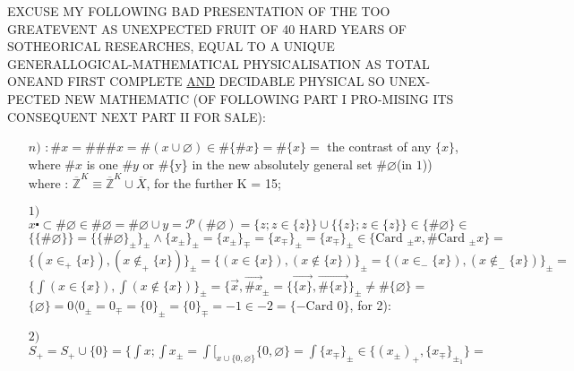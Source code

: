 \documentclass{article}
\begin{document}
\large
\noindent
EXCUSE MY FOLLOWING \guillemotleft BAD\guillemotright {} PRESENTATION OF THE TOO GREAT\linebreak EVENT AS UNEXPECTED FRUIT OF 40 HARD YEARS OF SO\linebreak THEORICAL RESEARCHES, EQUAL TO A UNIQUE GENERAL\linebreak LOGICAL-MATHEMATICAL PHYSICALISATION AS TOTAL ONE\linebreak AND FIRST COMPLETE \underline{AND} DECIDABLE PHYSICAL SO UNEX-\linebreak PECTED NEW MATHEMATIC (OF FOLLOWING PART I PRO-\linebreak MISING ITS CONSEQUENT NEXT PART II FOR SALE):
\begin{Large}{

\begin{itemize}
    \item[$n)$] $:\#x=\#\#\# x = \#(x\cup  \varnothing ) \in \# \{ \# x \} = \# \{x\}=$ the contrast of any\newline
    $\{x\}$, where $\# x$ is one \guillemotleft $\# y$ or \#\{y\}\guillemotright{} in the new absolutely general \newline
    set $\# \varnothing$(in $1$)) where : $\overline{\mathbb{Z}}^K \equiv \overline{\mathbb{Z}}^K \cup \overline{X}$, for the further K = 15;
    \item[$1)$]  $x \centerdot \subset \# \varnothing\in \#\varnothing = \#\varnothing\cup y= \mathcal{P}(\#\varnothing)=\{z;z\in \{z\}\}\cup \{\{z\};z\in \{z\}\} \in \{\#\varnothing\}\in $\newline
    $\{\{\#\varnothing\}\} = \{\{\#\varnothing\}_\pm\}_\pm \wedge \{x_\pm\}_\pm = \{x_\pm\}_\mp =\{x_\mp\}_\pm =\{x_\mp\}_\pm \in \{\text{Card }_\pm x, \# \text{Card }_\pm x \} = $\newline
    $\{(x\in_+ \{x\}),(x\notin_+ \{x\})\}_\pm = \{(x\in \{x\}),(x\notin\{x\})\}_\pm= \{(x\in_- \{x\}),(x\notin_- \{x\})\}_\pm =$  \newline
    $\{ \int (x\in \{x\}), \int (x\notin \{x\})\}_\pm = \{ \overrightarrow{x}, \overrightarrow{\# x}_\pm = \{  \overrightarrow{\{x\}},  \overrightarrow{\# \{x\}}\}_\pm \neq \# \{\varnothing\}=  $\newline
    $\{\varnothing\}= 0 \langle 0_\pm = 0_\mp = \{0\}_\pm = \{0\}_\mp = -1 \in -2 = \{-\text{Card } 0\}$, for 2):
    \item[$2)$] $S_+ = S_+ \cup \{ 0 \} = \{\int x ; \int x_\pm = \int \bigl[_{x\cup \{0,\varnothing\}} \{0,\varnothing\} = \int \{x_\mp\}_\pm \in \{(x_\pm)_+ , \{x_\mp\}_{\pm_1}\}=$ \newline

\end{itemize}}
\end{Large}
\end{document}
